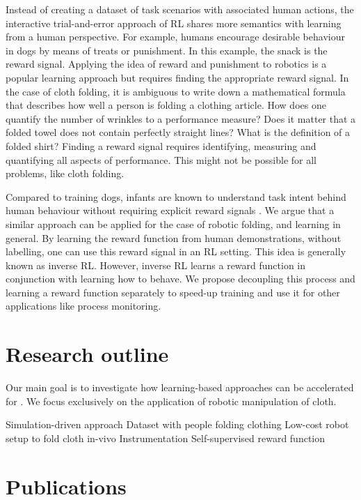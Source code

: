 \documentclass[\home/main.tex]{subfiles}
\begin{document}
Instead of creating a dataset of task scenarios with associated human actions, the interactive trial-and-error approach of \gls{RL} shares more semantics with learning from a human perspective. For example, humans encourage desirable behaviour in dogs by means of treats or punishment. In this example, the snack is the reward signal. Applying the idea of reward and punishment to robotics is a popular learning approach but requires finding the appropriate reward signal. In the case of cloth folding, it is ambiguous to write down a mathematical formula that describes how well a person is folding a clothing article. How does one quantify the number of wrinkles to a performance measure? Does it matter that a folded towel does not contain perfectly straight lines? What is the definition of a folded shirt? Finding a reward signal requires identifying, measuring and quantifying all aspects of performance. This might not be possible for all problems, like cloth folding.

Compared to training dogs, infants are known to understand task intent behind human behaviour without requiring explicit reward signals \autocite{warneken2006altruistic}.
We argue that a similar approach can be applied for the case of robotic folding, and learning in general. By learning the reward function from human demonstrations, without labelling, one can use this reward signal in an \gls{RL} setting. This idea is generally known as inverse \gls{RL}. However, inverse RL learns a reward function in conjunction with learning how to behave. We propose decoupling this process and learning a reward function separately to speed-up training and use it for other applications like process monitoring.

\section{Research outline}
Our main goal is to investigate how learning-based approaches can be accelerated for . We focus exclusively on the application of robotic manipulation of cloth.

Simulation-driven approach
Dataset with people folding clothing
Low-cost robot setup to fold cloth in-vivo
Instrumentation
Self-supervised reward function

\section{Publications}
\end{document}
